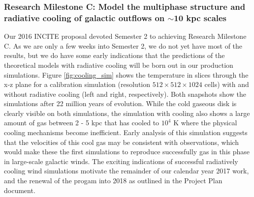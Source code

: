 \documentclass[11pt,letterpaper,english]{article}
\begin{document}
\subsubsection{Research Milestone C: Model the multiphase structure and radiative cooling of galactic outflows on $\sim$10 kpc scales}

Our 2016 INCITE proposal devoted Semester 2 to achieving Research Milestone C. As we are only a few weeks into Semester 2, we do not yet have most of the results, but we do have some early indications that the predictions of the theoretical models with radiative cooling will be born out in our production simulations. Figure \ref{fig:cooling_sim} shows the temperature in slices through the x-z plane for a calibration simulation (resolution $512\times512\times1024$ cells) with and without radiative cooling (left and right, respectively). Both snapshots show the simulations after 22 million years of evolution. While the cold gaseous disk is clearly visible on both simulations, the simulation with cooling also shows a large amount of gas between 2 - 5 kpc that has cooled to $10^4$ K where the physical cooling mechanisms
become inefficient. Early analysis of this simulation suggests that the velocities of this cool gas may be consistent with observations, which would make these the first simulations to reproduce successfully gas in this phase in large-scale galactic winds. The exciting indications of successful
radiatively cooling wind simulations motivate the remainder of our calendar year 2017 work, and the renewal of the
progam into 2018 as outlined in the Project Plan document.
\end{document}
